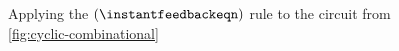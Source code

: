 \begin{figure}
    \centering
    \caption{
        Applying the \((\instantfeedbackeqn)\) rule to the circuit from
        \cref{fig:cyclic-combinational}
    }
    \label{fig:cyclic-combinational-unrolled}
\end{figure}